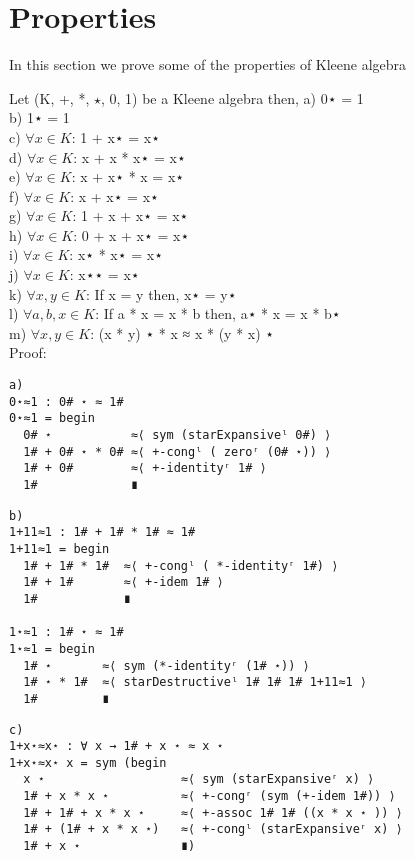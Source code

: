 \section{Properties}
In this section we prove some of the properties of Kleene algebra

Let (K, +, *, \(\star\), 0, 1) be a Kleene algebra then,
a) 0⋆ = 1\\
b) 1⋆ = 1\\
c) \(\forall x \in K\): 1 + x⋆ = x⋆\\
d) \(\forall x \in K\): x + x * x⋆ = x⋆\\
e) \(\forall x \in K\): x + x⋆ * x = x⋆\\
f) \(\forall x \in K\): x + x⋆ = x⋆\\
g) \(\forall x \in K\): 1 + x + x⋆ = x⋆\\
h) \(\forall x \in K\): 0 + x + x⋆ = x⋆\\
i) \(\forall x \in K\): x⋆ * x⋆ = x⋆\\
j) \(\forall x \in K\): x⋆⋆ = x⋆\\
k) \(\forall x , y \in K\): If x = y then, x⋆ = y⋆\\
l) \(\forall a, b, x \in K\): If a * x = x * b then, a⋆ * x = x * b⋆\\
m) \(\forall x, y \in K\): (x * y) ⋆ * x ≈ x * (y * x) ⋆\\
Proof:
\begin{Verbatim}
a)
0⋆≈1 : 0# ⋆ ≈ 1#
0⋆≈1 = begin
  0# ⋆           ≈⟨ sym (starExpansiveˡ 0#) ⟩
  1# + 0# ⋆ * 0# ≈⟨ +-congˡ ( zeroʳ (0# ⋆)) ⟩
  1# + 0#        ≈⟨ +-identityʳ 1# ⟩
  1#             ∎
\end{Verbatim}

\begin{Verbatim}
b)
1+11≈1 : 1# + 1# * 1# ≈ 1#
1+11≈1 = begin
  1# + 1# * 1#  ≈⟨ +-congˡ ( *-identityʳ 1#) ⟩
  1# + 1#       ≈⟨ +-idem 1# ⟩
  1#            ∎

1⋆≈1 : 1# ⋆ ≈ 1#
1⋆≈1 = begin
  1# ⋆       ≈⟨ sym (*-identityʳ (1# ⋆)) ⟩
  1# ⋆ * 1#  ≈⟨ starDestructiveˡ 1# 1# 1# 1+11≈1 ⟩
  1#         ∎
\end{Verbatim}

\begin{Verbatim}
c)
1+x⋆≈x⋆ : ∀ x → 1# + x ⋆ ≈ x ⋆
1+x⋆≈x⋆ x = sym (begin
  x ⋆                   ≈⟨ sym (starExpansiveʳ x) ⟩
  1# + x * x ⋆          ≈⟨ +-congʳ (sym (+-idem 1#)) ⟩
  1# + 1# + x * x ⋆     ≈⟨ +-assoc 1# 1# ((x * x ⋆ )) ⟩
  1# + (1# + x * x ⋆)   ≈⟨ +-congˡ (starExpansiveʳ x) ⟩
  1# + x ⋆              ∎)
\end{Verbatim}

